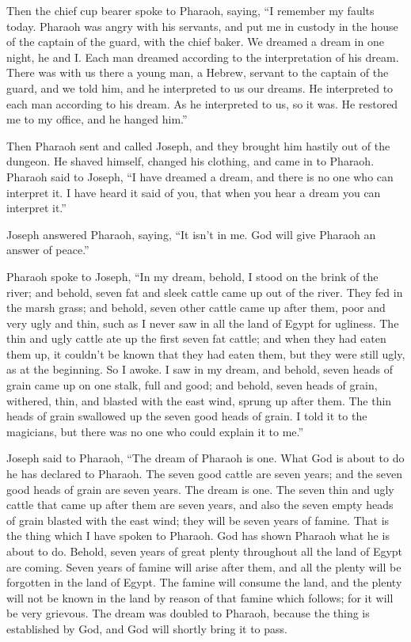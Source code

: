  Then the chief cup bearer spoke to Pharaoh, saying, ``I
remember my faults today.  Pharaoh was angry with his
servants, and put me in custody in the house of the captain of the
guard, with the chief baker.  We dreamed a dream in one
night, he and I. Each man dreamed according to the interpretation of his
dream.  There was with us there a young man, a Hebrew,
servant to the captain of the guard, and we told him, and he interpreted
to us our dreams. He interpreted to each man according to his dream.
 As he interpreted to us, so it was. He restored me to my
office, and he hanged him.''

 Then Pharaoh sent and called Joseph, and they brought him
hastily out of the dungeon. He shaved himself, changed his clothing, and
came in to Pharaoh.  Pharaoh said to Joseph, ``I have
dreamed a dream, and there is no one who can interpret it. I have heard
it said of you, that when you hear a dream you can interpret it.''

 Joseph answered Pharaoh, saying, ``It isn't in me. God
will give Pharaoh an answer of peace.''

 Pharaoh spoke to Joseph, ``In my dream, behold, I stood on
the brink of the river;  and behold, seven fat and sleek
cattle came up out of the river. They fed in the marsh grass;
 and behold, seven other cattle came up after them, poor
and very ugly and thin, such as I never saw in all the land of Egypt for
ugliness.  The thin and ugly cattle ate up the first seven
fat cattle;  and when they had eaten them up, it couldn't
be known that they had eaten them, but they were still ugly, as at the
beginning. So I awoke.  I saw in my dream, and behold,
seven heads of grain came up on one stalk, full and good; 
and behold, seven heads of grain, withered, thin, and blasted with the
east wind, sprung up after them.  The thin heads of grain
swallowed up the seven good heads of grain. I told it to the magicians,
but there was no one who could explain it to me.''

 Joseph said to Pharaoh, ``The dream of Pharaoh is one.
What God is about to do he has declared to Pharaoh.  The
seven good cattle are seven years; and the seven good heads of grain are
seven years. The dream is one.  The seven thin and ugly
cattle that came up after them are seven years, and also the seven empty
heads of grain blasted with the east wind; they will be seven years of
famine.  That is the thing which I have spoken to Pharaoh.
God has shown Pharaoh what he is about to do.  Behold,
seven years of great plenty throughout all the land of Egypt are coming.
 Seven years of famine will arise after them, and all the
plenty will be forgotten in the land of Egypt. The famine will consume
the land,  and the plenty will not be known in the land by
reason of that famine which follows; for it will be very grievous.
 The dream was doubled to Pharaoh, because the thing is
established by God, and God will shortly bring it to pass.


